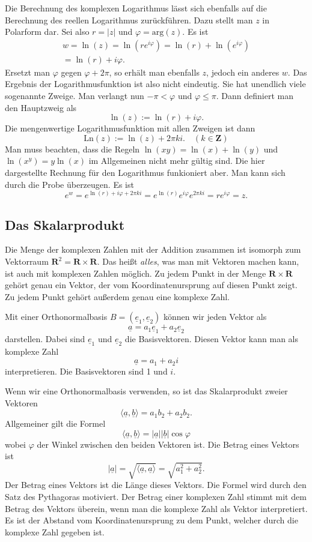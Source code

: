 \documentclass[a4paper,10pt,fleqn,twocolumn,twoside]{article}
\begin{document}
Die Berechnung des komplexen Logarithmus lässt sich ebenfalls
auf die Berechnung des reellen Logarithmus zurückführen. Dazu stellt
man \(z\) in Polarform dar. Sei also \(r=|z|\) und
\(\varphi = \mathrm{arg}(z)\). Es ist
\begin{gather*}
w = \ln(z) = \ln(re^{i\varphi})
= \ln(r)+\ln(e^{i\varphi})\\
= \ln(r)+i\varphi.
\end{gather*}
Ersetzt man \(\varphi\) gegen \(\varphi+2\pi\), so erhält man
ebenfalls \(z\), jedoch ein anderes \(w\). Das Ergebnis der
Logarithmusfunktion ist also nicht eindeutig. Sie hat unendlich
viele sogenannte Zweige. Man verlangt nun \(-\pi<\varphi\) und
\(\varphi\le\pi\). Dann definiert man den Hauptzweig als
\[\ln(z):=\ln(r)+i\varphi.\]
Die mengenwertige Logarithmusfunktion mit allen Zweigen ist dann
\[\mathrm{Ln}(z):=\ln(z)+2\pi ki.\quad(k\in\mathbf Z)\]
Man muss beachten, dass die Regeln \(\ln(xy)=\ln(x)+\ln(y)\)
und \(\ln(x^y)=y\ln(x)\) im Allgemeinen nicht mehr gültig sind.
Die hier dargestellte Rechnung für den Logarithmus funkioniert aber.
Man kann sich durch die Probe überzeugen. Es ist
\[e^w = e^{\ln(r)+i\varphi+2\pi ki}
= e^{\ln(r)}e^{i\varphi}e^{2\pi ki} = re^{i\varphi} = z.\]

\subsection{Das Skalarprodukt}

Die Menge der komplexen Zahlen mit der Addition zusammen ist
isomorph zum Vektorraum
\(\mathbf{R}^2 = \mathbf{R}\times\mathbf{R}\).
Das heißt \textit{alles}, was man mit Vektoren machen kann, ist auch
mit komplexen Zahlen möglich. Zu jedem Punkt in der Menge
\(\mathbf{R}\times\mathbf{R}\) gehört genau ein Vektor, der vom
Koordinatenursprung auf diesen Punkt zeigt. Zu jedem Punkt gehört
außerdem genau eine komplexe Zahl.

Mit einer Orthonormalbasis \(B=(\underline e_1,\underline e_2)\)
können wir jeden Vektor als
\[\underline a = a_1\underline e_1+a_2\underline e_2\]
darstellen. Dabei sind \(\underline e_1\) und \(\underline e_2\) die
Basisvektoren. Diesen Vektor kann man als komplexe Zahl
\[\underline a = a_1+a_2i\]
interpretieren. Die Basisvektoren sind 1 und \(i\).

Wenn wir eine Orthonormalbasis verwenden, so ist das Skalarprodukt
zweier Vektoren
\[\langle \underline a, \underline b\rangle = a_1b_2+a_2b_2.\]
\noindent
Allgemeiner gilt die Formel
\[\langle \underline a, \underline b\rangle
= |\underline a||\underline b|\cos\varphi\]
wobei \(\varphi\) der Winkel zwischen den beiden Vektoren ist.
Die Betrag eines Vektors ist
\[|\underline a| = \sqrt{\langle \underline a, \underline a\rangle}
= \sqrt{a_1^2+a_2^2}.\]
Der Betrag eines Vektors ist die Länge dieses Vektors. Die Formel wird
durch den Satz des Pythagoras motiviert. Der Betrag einer komplexen
Zahl stimmt mit dem Betrag des Vektors überein, wenn man die komplexe
Zahl als Vektor interpretiert. Es ist der Abstand vom
Koordinatenursprung zu dem Punkt, welcher durch die komplexe Zahl
gegeben ist.
\end{document}
